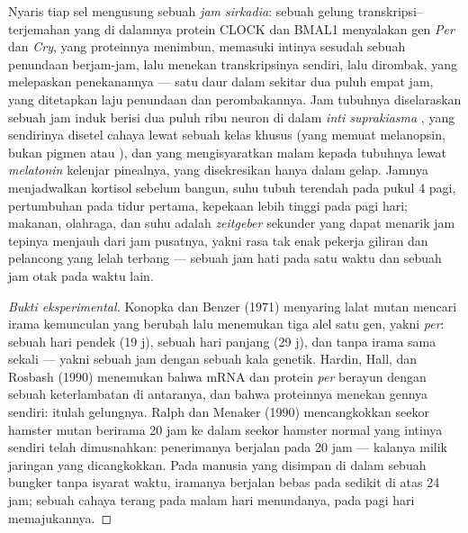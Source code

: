 \begin{definition}\label{def:b3:endocrinology:clock}
%
Nyaris tiap sel mengusung sebuah \emph{jam sirkadia}: sebuah
gelung transkripsi--terjemahan yang di dalamnya protein CLOCK dan BMAL1
menyalakan gen \emph{Per} dan \emph{Cry}, yang proteinnya
menimbun, memasuki intinya sesudah sebuah penundaan berjam-jam, lalu menekan
transkripsinya sendiri, lalu dirombak, yang melepaskan penekanannya --- satu
daur dalam sekitar dua puluh empat jam, yang ditetapkan laju penundaan dan
perombakannya. Jam tubuhnya diselaraskan sebuah jam induk
berisi dua puluh ribu neuron di dalam \emph{inti suprakiasma}
, yang sendirinya disetel cahaya lewat sebuah kelas khusus
  (yang memuat melanopsin, bukan pigmen  atau
), dan yang mengisyaratkan malam kepada tubuhnya lewat
\emph{melatonin} kelenjar pinealnya, yang disekresikan hanya dalam gelap. Jamnya
menjadwalkan kortisol sebelum bangun, suhu tubuh terendah pada pukul 4 pagi,
 pertumbuhan pada tidur pertama, kepekaan  lebih tinggi pada
pagi hari; makanan, olahraga, dan suhu adalah \emph{zeitgeber}
sekunder yang dapat menarik jam tepinya menjauh dari jam
pusatnya, yakni rasa tak enak pekerja giliran dan pelancong yang lelah terbang ---
sebuah jam hati pada satu waktu dan sebuah jam otak pada waktu lain.
\end{definition}

\begin{proof}[Bukti eksperimental]
Konopka dan Benzer (1971) menyaring lalat mutan mencari irama kemunculan
yang berubah lalu menemukan tiga alel satu gen, yakni \emph{per}: sebuah hari
pendek (19 j), sebuah hari panjang (29 j), dan tanpa irama sama sekali --- yakni sebuah jam dengan
sebuah kala genetik. Hardin, Hall, dan Rosbash (1990) menemukan bahwa
mRNA dan protein \emph{per} berayun dengan sebuah keterlambatan di antaranya, dan
bahwa proteinnya menekan gennya sendiri: itulah gelungnya. Ralph dan Menaker
(1990) mencangkokkan  seekor hamster mutan berirama
20 jam ke dalam seekor hamster normal yang intinya sendiri telah
dimusnahkan: penerimanya berjalan pada 20 jam --- kalanya milik
jaringan yang dicangkokkan. Pada manusia yang disimpan di dalam sebuah bungker tanpa isyarat waktu,
iramanya berjalan bebas pada sedikit di atas 24 jam; sebuah cahaya terang pada
malam hari menundanya, pada pagi hari memajukannya.
\end{proof}

